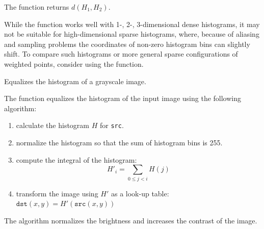 The function returns $d(H_1, H_2)$.

While the function works well with 1-, 2-, 3-dimensional dense histograms, it may not be suitable for high-dimensional sparse histograms, where, because of aliasing and sampling problems the coordinates of non-zero histogram bins can slightly shift. To compare such histograms or more general sparse configurations of weighted points, consider using the  function.

Equalizes the histogram of a grayscale image.

\begin{description}
\end{description}

The function equalizes the histogram of the input image using the following algorithm:

\begin{enumerate}
\item calculate the histogram $H$ for \texttt{src}.
\item normalize the histogram so that the sum of histogram bins is 255.
\item compute the integral of the histogram:
\[
H'_i = \sum_{0 \le j < i} H(j)
\]
\item transform the image using $H'$ as a look-up table: $\texttt{dst}(x,y) = H'(\texttt{src}(x,y))$
\end{enumerate}

The algorithm normalizes the brightness and increases the contrast of the image.

\fi

